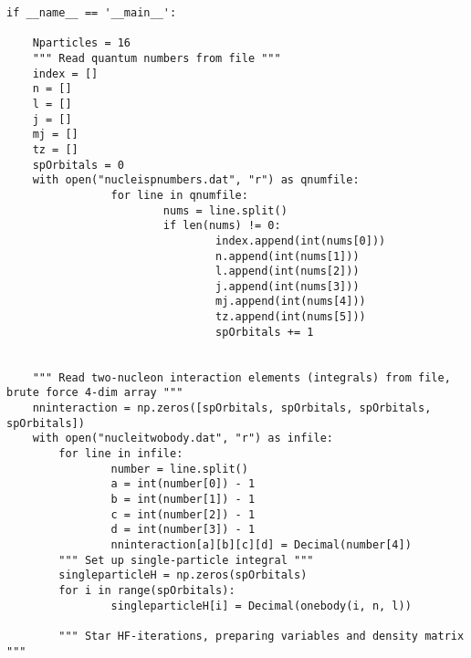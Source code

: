 \documentclass[%
oneside,                 %
final,                   %
10pt]{article}
\newenvironment{doconceexercise}{}{}
\begin{document}
\begin{doconceexercise}
\begin{verbatim}
if __name__ == '__main__':
        
    Nparticles = 16
    """ Read quantum numbers from file """
    index = []
    n = []
    l = []
    j = []
    mj = []
    tz = []
    spOrbitals = 0
    with open("nucleispnumbers.dat", "r") as qnumfile:
                for line in qnumfile:
                        nums = line.split()
                        if len(nums) != 0:
                                index.append(int(nums[0]))
                                n.append(int(nums[1]))
                                l.append(int(nums[2]))
                                j.append(int(nums[3]))
                                mj.append(int(nums[4]))
                                tz.append(int(nums[5]))
                                spOrbitals += 1


    """ Read two-nucleon interaction elements (integrals) from file, brute force 4-dim array """
    nninteraction = np.zeros([spOrbitals, spOrbitals, spOrbitals, spOrbitals])
    with open("nucleitwobody.dat", "r") as infile:
        for line in infile:
                number = line.split()
                a = int(number[0]) - 1
                b = int(number[1]) - 1
                c = int(number[2]) - 1
                d = int(number[3]) - 1
                nninteraction[a][b][c][d] = Decimal(number[4])
        """ Set up single-particle integral """
        singleparticleH = np.zeros(spOrbitals)
        for i in range(spOrbitals):
                singleparticleH[i] = Decimal(onebody(i, n, l))
        
        """ Star HF-iterations, preparing variables and density matrix """


\end{verbatim}
\end{doconceexercise}
\end{document}
